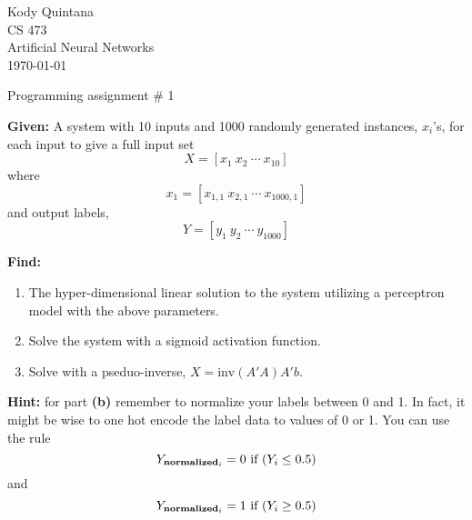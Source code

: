 \documentclass[14pt]{article}
\begin{document}
\begin{flushleft}
 
\large
Kody Quintana\\
CS 473\\
Artificial Neural Networks\\
\today\\
\boldmath

\begin{center}
Programming assignment \# 1
\end{center}

\question
\textbf{Given:}
	A system with 10 inputs and 1000 randomly generated instances, $x_i$'s,
	for each input to give a full input set
	\[X = [x_1  \ x_2  \ \cdots \ x_{10}]\]
	where
	\[x_1 = [x_{1,1} \  x_{2,1}  \ \cdots \  x_{1000,1}]\]
	and output labels,
	\[Y = [y_1 \ y_2 \ \cdots \ y_{1000}]\]
\closequestion

\question
\textbf{Find:}
	\begin{enumerate}[label = \textbf{(\alph*)}]
	\item
		The hyper-dimensional linear solution to the system
		utilizing a perceptron model with the above parameters.
	\item
		Solve the system with a sigmoid activation function.
	\item
		Solve with a pseduo-inverse, $X = \text{inv}(A'A)A'b.$
	\end{enumerate}
\closequestion

\question
\textbf{Hint:}
	for part \textbf{(b)} remember to normalize your labels between 0 and 1.
	In fact, it might be wise to one hot encode the label data to values of 0 or 1.
	You can use the rule
	\[Y_{\text{\textbf{normalized}}_{i}} = 0
	\ \text{if} \
	(Y_i \leq 0.5)\]
	and 
	\[Y_{\text{\textbf{normalized}}_{i}} = 1
	\ \text{if} \
	(Y_i \geq 0.5)\]
\closequestion



\end{flushleft}
\end{document}
